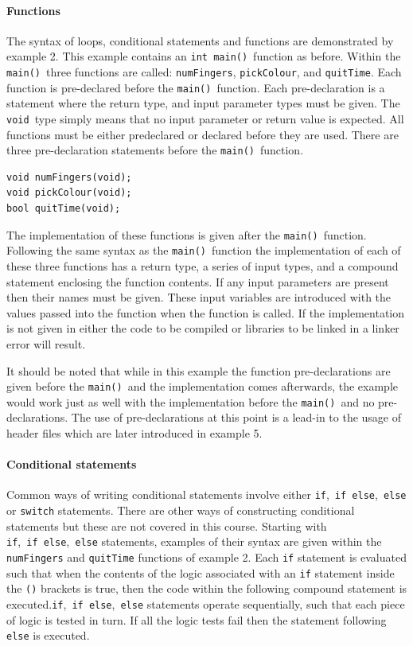 \documentclass[11pt]{scrartcl}
\def\main{\texttt{main()}}
\def\intmain{\texttt{int main()}}
\def\void{\texttt{void}}
\begin{document}
\paragraph{Functions}
The syntax of loops, conditional statements and functions are
demonstrated by example 2.  This example contains an \intmain\ function
as before.  Within the \main\ three functions are called:
\texttt{numFingers}, \texttt{pickColour}, and
\texttt{quitTime}.  Each function is pre-declared before the \main\ function.  Each pre-declaration is a statement where the return type, and input parameter types must be given.  The \void\ type simply means that no input parameter or return value is expected.  All functions must be either predeclared or declared before they are used.  There are three pre-declaration statements before the \main\ function.
\begin{lstlisting}
void numFingers(void);
void pickColour(void);
bool quitTime(void);
\end{lstlisting}
The implementation of these functions is given after the \main\ function.  Following the same syntax as the \main\ function the implementation of each of these three functions has a return type, a series of input types, and a compound statement enclosing the function contents.  If any input parameters are present then their names must be given.  These input variables are introduced with the values passed into the function when the function is called.  If the implementation is not given in either the code to be compiled or libraries to be linked in a linker error will result.

It should be noted that while in this example the function pre-declarations are given before the \main\ and the implementation
comes afterwards, the example would work just as well with the
implementation before the \main\ and no pre-declarations.  The use of pre-declarations at this point is a lead-in to the usage of header files which are later introduced in example 5.

\paragraph{Conditional statements}
Common ways of writing conditional statements involve either \texttt{if},~\texttt{if~else},~\texttt{else} or \texttt{switch} statements.  There are other ways of constructing conditional statements but these are not covered in this course.  Starting with \texttt{if},~\texttt{if~else},~\texttt{else} statements, examples of their syntax are given within the \texttt{numFingers} and \texttt{quitTime} functions of example 2.  Each \texttt{if} statement is evaluated such that when the contents of the logic associated with an \texttt{if} statement inside the \texttt{()} brackets is true, then the code within the following compound statement is executed.\texttt{if},~\texttt{if~else},~\texttt{else} statements operate
sequentially, such that each piece of logic is tested in turn.  If all the logic tests fail then the statement following \texttt{else} is executed.
\end{document}
